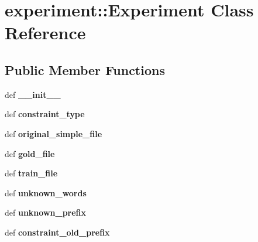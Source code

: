 \hypertarget{classexperiment_1_1Experiment}{
\section{experiment::Experiment Class Reference}
\label{classexperiment_1_1Experiment}
}
\subsection*{Public Member Functions}
\begin{DoxyCompactItemize}
\item 
\hypertarget{classexperiment_1_1Experiment_a489236b1bac38bb491fb41331f5f4d7e}{
def {\bfseries \_\-\_\-init\_\-\_\-}}
\label{classexperiment_1_1Experiment_a489236b1bac38bb491fb41331f5f4d7e}

\item 
\hypertarget{classexperiment_1_1Experiment_a711153cbf7f9263c3b4ad9401fbdefa2}{
def {\bfseries constraint\_\-type}}
\label{classexperiment_1_1Experiment_a711153cbf7f9263c3b4ad9401fbdefa2}

\item 
\hypertarget{classexperiment_1_1Experiment_af1ca6cc18687be81fe454ab69ecbe9b7}{
def {\bfseries original\_\-simple\_\-file}}
\label{classexperiment_1_1Experiment_af1ca6cc18687be81fe454ab69ecbe9b7}

\item 
\hypertarget{classexperiment_1_1Experiment_a44eeb71b713a1b60d998455ce353d04f}{
def {\bfseries gold\_\-file}}
\label{classexperiment_1_1Experiment_a44eeb71b713a1b60d998455ce353d04f}

\item 
\hypertarget{classexperiment_1_1Experiment_a38908cb15592fb9fde7a16dc08db7c96}{
def {\bfseries train\_\-file}}
\label{classexperiment_1_1Experiment_a38908cb15592fb9fde7a16dc08db7c96}

\item 
\hypertarget{classexperiment_1_1Experiment_a616ebdc84f377a7a029e5c2945d6d0ca}{
def {\bfseries unknown\_\-words}}
\label{classexperiment_1_1Experiment_a616ebdc84f377a7a029e5c2945d6d0ca}

\item 
\hypertarget{classexperiment_1_1Experiment_a449c90ab5ca829ff11de1fd82db330a1}{
def {\bfseries unknown\_\-prefix}}
\label{classexperiment_1_1Experiment_a449c90ab5ca829ff11de1fd82db330a1}

\item 
\hypertarget{classexperiment_1_1Experiment_a9c772c083078909fc5695e048b27c92e}{
def {\bfseries constraint\_\-old\_\-prefix}}
\label{classexperiment_1_1Experiment_a9c772c083078909fc5695e048b27c92e}


\end{DoxyCompactItemize}
